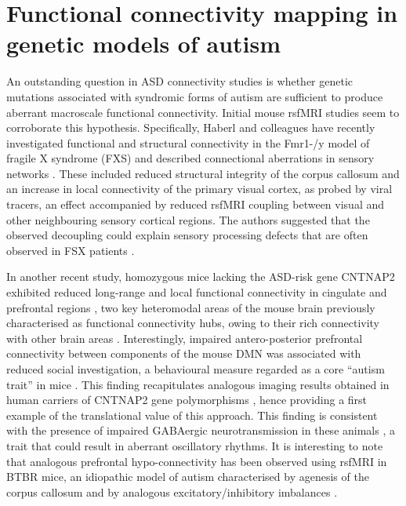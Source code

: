 \section{Functional connectivity mapping in genetic models of autism}

An outstanding question in ASD connectivity studies is whether genetic mutations
associated with syndromic forms of autism are sufficient to produce aberrant
macroscale functional connectivity. Initial mouse rsfMRI studies seem to
corroborate this hypothesis. Specifically, Haberl and colleagues have recently
investigated functional and structural connectivity in the Fmr1-/y model of
fragile X syndrome (FXS) \parencite{budimirovic2011} and described connectional
aberrations in sensory networks \parencite{haberl2015}. These included reduced
structural integrity of the corpus callosum and an increase in local
connectivity of the primary visual cortex, as probed by viral tracers, an effect
accompanied by reduced rsfMRI coupling between visual and other neighbouring
sensory cortical regions. The authors suggested that the observed decoupling
could explain sensory processing defects that are often observed in FSX patients
\parencite{boyd2010}. 

In another recent study, homozygous mice lacking the ASD-risk gene CNTNAP2
\parencite{penagarikano2011} exhibited reduced long-range and local functional
connectivity in cingulate and prefrontal regions \parencite{liska2017}, two key
heteromodal areas of the mouse brain previously characterised as functional
connectivity hubs, owing to their rich connectivity with other brain areas
\parencite{liska2015}. Interestingly, impaired antero-posterior prefrontal
connectivity between components of the mouse DMN was associated with reduced
social investigation, a behavioural measure regarded as a core “autism trait” in
mice \parencite{wohr2013}. This finding recapitulates analogous imaging results
obtained in human carriers of CNTNAP2 gene polymorphisms
\parencite{scott-vanzeeland2010}, hence providing a first example of the
translational value of this approach. This finding is consistent with the
presence of impaired GABAergic neurotransmission in these animals
\parencite{penagarikano2011}, a trait that could result in aberrant oscillatory
rhythms. It is interesting to note that analogous prefrontal hypo-connectivity
has been observed using rsfMRI in BTBR mice, an idiopathic model of autism
characterised by agenesis of the corpus callosum and by analogous
excitatory/inhibitory imbalances \parencite{sforazzini2016}.

